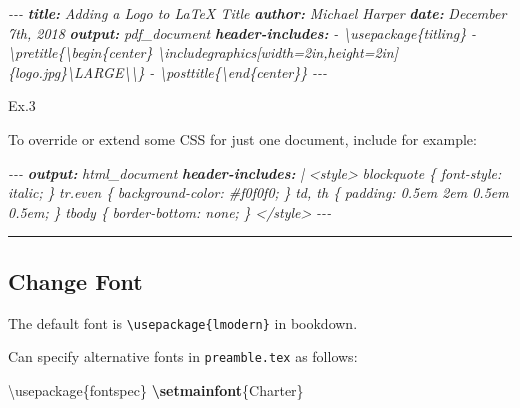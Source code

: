 \documentclass[
  a4paper,
  twoside,
  openright]{book}
\newenvironment{Shaded}{\begin{snugshade}}{\end{snugshade}}
\newcommand{\AnnotationTok}[1]{\textcolor[rgb]{0.56,0.35,0.01}{\textbf{\textit{#1}}}}
\newcommand{\BuiltInTok}[1]{#1}
\newcommand{\CommentTok}[1]{\textcolor[rgb]{0.56,0.35,0.01}{\textit{#1}}}
\newcommand{\ExtensionTok}[1]{#1}
\newcommand{\FunctionTok}[1]{\textcolor[rgb]{0.13,0.29,0.53}{\textbf{#1}}}
\newcommand{\NormalTok}[1]{#1}
\theoremstyle{definition}
\theoremstyle{definition}
\theoremstyle{definition}
\theoremstyle{definition}
\theoremstyle{remark}
\begin{document}
\begin{Shaded}
\begin{Highlighting}[]
\CommentTok{{-}{-}{-}}
\AnnotationTok{title:}\CommentTok{ Adding a Logo to LaTeX Title}
\AnnotationTok{author:}\CommentTok{ Michael Harper}
\AnnotationTok{date:}\CommentTok{ December 7th, 2018}
\AnnotationTok{output:}\CommentTok{ pdf\_document}
\AnnotationTok{header{-}includes:}
\CommentTok{  {-} \textbackslash{}usepackage\{titling\}}
\CommentTok{  {-} \textbackslash{}pretitle\{\textbackslash{}begin\{center\}}
\CommentTok{    \textbackslash{}includegraphics[width=2in,height=2in]\{logo.jpg\}\textbackslash{}LARGE\textbackslash{}\textbackslash{}\}}
\CommentTok{  {-} \textbackslash{}posttitle\{\textbackslash{}end\{center\}\}}
\CommentTok{{-}{-}{-}}
\end{Highlighting}
\end{Shaded}

Ex.3

To override or extend some CSS for just one document, include for example:

\begin{Shaded}
\begin{Highlighting}[]
\CommentTok{{-}{-}{-}}
\AnnotationTok{output:}\CommentTok{ html\_document}
\AnnotationTok{header{-}includes:}\CommentTok{ |}
\CommentTok{  \textless{}style\textgreater{}}
\CommentTok{  blockquote \{}
\CommentTok{    font{-}style: italic;}
\CommentTok{  \}}
\CommentTok{  tr.even \{}
\CommentTok{    background{-}color: \#f0f0f0;}
\CommentTok{  \}}
\CommentTok{  td, th \{}
\CommentTok{    padding: 0.5em 2em 0.5em 0.5em;}
\CommentTok{  \}}
\CommentTok{  tbody \{}
\CommentTok{    border{-}bottom: none;}
\CommentTok{  \}}
\CommentTok{  \textless{}/style\textgreater{}}
\CommentTok{{-}{-}{-}}
\end{Highlighting}
\end{Shaded}

\begin{center}\rule{0.5\linewidth}{0.5pt}\end{center}

\subsection*{Change Font}\label{change-font}

The default font is \texttt{\textbackslash{}usepackage\{lmodern\}} in bookdown.

Can specify alternative fonts in \texttt{preamble.tex} as follows:

\begin{Shaded}
\begin{Highlighting}[]
\BuiltInTok{\textbackslash{}usepackage}\NormalTok{\{}\ExtensionTok{fontspec}\NormalTok{\}}
\FunctionTok{\textbackslash{}setmainfont}\NormalTok{\{Charter\}}
\end{Highlighting}
\end{Shaded}
\end{document}
